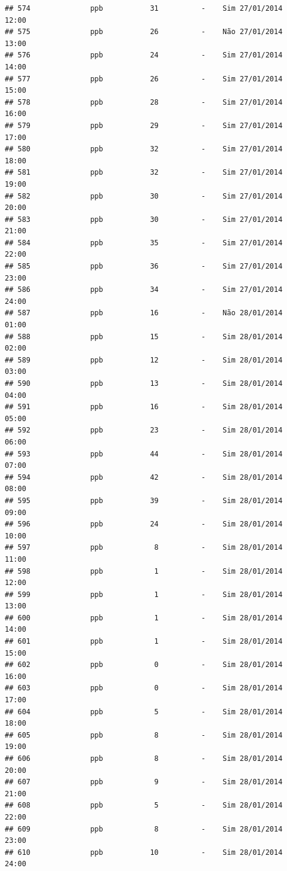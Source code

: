 \documentclass[]{book}
\begin{document}
\begin{verbatim}
## 574              ppb           31          -    Sim 27/01/2014 12:00
## 575              ppb           26          -    Não 27/01/2014 13:00
## 576              ppb           24          -    Sim 27/01/2014 14:00
## 577              ppb           26          -    Sim 27/01/2014 15:00
## 578              ppb           28          -    Sim 27/01/2014 16:00
## 579              ppb           29          -    Sim 27/01/2014 17:00
## 580              ppb           32          -    Sim 27/01/2014 18:00
## 581              ppb           32          -    Sim 27/01/2014 19:00
## 582              ppb           30          -    Sim 27/01/2014 20:00
## 583              ppb           30          -    Sim 27/01/2014 21:00
## 584              ppb           35          -    Sim 27/01/2014 22:00
## 585              ppb           36          -    Sim 27/01/2014 23:00
## 586              ppb           34          -    Sim 27/01/2014 24:00
## 587              ppb           16          -    Não 28/01/2014 01:00
## 588              ppb           15          -    Sim 28/01/2014 02:00
## 589              ppb           12          -    Sim 28/01/2014 03:00
## 590              ppb           13          -    Sim 28/01/2014 04:00
## 591              ppb           16          -    Sim 28/01/2014 05:00
## 592              ppb           23          -    Sim 28/01/2014 06:00
## 593              ppb           44          -    Sim 28/01/2014 07:00
## 594              ppb           42          -    Sim 28/01/2014 08:00
## 595              ppb           39          -    Sim 28/01/2014 09:00
## 596              ppb           24          -    Sim 28/01/2014 10:00
## 597              ppb            8          -    Sim 28/01/2014 11:00
## 598              ppb            1          -    Sim 28/01/2014 12:00
## 599              ppb            1          -    Sim 28/01/2014 13:00
## 600              ppb            1          -    Sim 28/01/2014 14:00
## 601              ppb            1          -    Sim 28/01/2014 15:00
## 602              ppb            0          -    Sim 28/01/2014 16:00
## 603              ppb            0          -    Sim 28/01/2014 17:00
## 604              ppb            5          -    Sim 28/01/2014 18:00
## 605              ppb            8          -    Sim 28/01/2014 19:00
## 606              ppb            8          -    Sim 28/01/2014 20:00
## 607              ppb            9          -    Sim 28/01/2014 21:00
## 608              ppb            5          -    Sim 28/01/2014 22:00
## 609              ppb            8          -    Sim 28/01/2014 23:00
## 610              ppb           10          -    Sim 28/01/2014 24:00

\end{verbatim}
\end{document}
